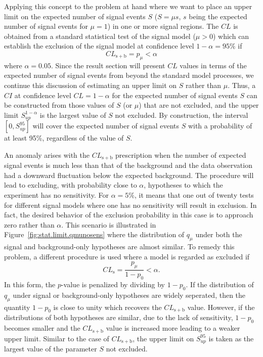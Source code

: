 Applying this concept to the problem at hand where we want to place an upper limit on the expected number of 
signal events $S$ ($S=\mu s$, $s$ being the expected number of signal events for $\mu=1$) in one or more signal regions.
The $CL$ is obtained from a standard statistical test of the signal model ($\mu>0$) which can establish the exclusion of the signal 
model at confidence level $1-\alpha = 95 \%$ if 
\begin{equation}
  CL_\mathrm{s+b}  = p_{\mu} < \alpha
\end{equation}
where $\alpha=0.05$. 
Since the result section will present $CL$ values in terms of the expected number of signal events from beyond the standard model 
processes, we continue this discussion of estimating an upper limit on $S$ rather than $\mu$.
Thus, a $CI$ at confidence level $CL=1-\alpha$ for the expected number of signal events $S$ can be constructed from those values of
$S$ (or $\mu$) that are not excluded, and the upper limit $S_{up}^{1-\alpha}$ is the largest value of $S$ not excluded.
By construction, the interval $[0,S_{up}^{95}]$ will cover the expected number of signal events $S$ with a probability of at least 
95\%, regardless of the value of $S$.

An anomaly arises with the $CL_\mathrm{s+b}$ prescription when the number of expected signal events is much less than that of 
the background and the data observation had a downward fluctuation below the expected background.
The procedure will lead to excluding, with probability close to $\alpha$, hypotheses to which the experiment has no sensitivity.
For $\alpha=5\%$, it means that one out of twenty tests for different signal models where one has no sensitivity will result in exclusion.
In fact, the desired behavior of the exclusion probability in this case is to approach zero rather than $\alpha$.
This scenario is illustrated in Figure~\ref{fig:stat.limit.qmunosens} where the distribution of $q_{\mu}$
under both the signal and background-only hypotheses are almost similar. 
To remedy this problem, a different procedure is used where a model is regarded as excluded if 
\begin{equation}
  CL_\mathrm{s}  = \frac
{p_{\mu}}
{1-p_{0}}
< \alpha.
\end{equation}
In this form, the $p$-value is penalized by dividing by $1-p_{0}$. 
If the distribution of $q_{\mu}$ under signal or background-only hypotheses are widely seperated, then 
the quantity $1-p_{0}$ is close to unity which recovers the $CL_\mathrm{s+b}$ value. However, if
the distributions of both hypotheses are similar, due to the lack of sensitivity, $1-p_{0}$ becomes smaller
and the $CL_\mathrm{s+b}$ value is increased more leading to a weaker upper limit. 
Similar to the case of $CL_\mathrm{s+b}$, the upper limit on $S_{up}^{95}$ is taken as the largest value of the parameter
$S$ not excluded.
